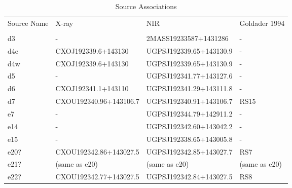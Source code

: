 \begin{table*}[htp]
\caption{Source Associations}
\begin{tabular}{llll}
\label{tab:associations}
Source Name & X-ray & NIR & Goldader 1994 \\
 &  &  &  \\
\hline
d3 & - & 2MASS19233587+1431286 & - \\
d4e & CXOJ192339.6+143130 & UGPSJ192339.65+143130.9 & - \\
d4w & CXOJ192339.6+143130 & UGPSJ192339.65+143130.9 & - \\
d5 & - & UGPSJ192341.77+143127.6 & - \\
d6 & CXOJ192341.1+143110 & UGPSJ192341.29+143111.8 & - \\
d7 & CXOU192340.96+143106.7 & UGPSJ192340.91+143106.7 & RS15 \\
e7 & - & UGPSJ192344.79+142911.2 & - \\
e14 & - & UGPSJ192342.60+143042.2 & - \\
e15 & - & UGPSJ192338.65+143005.8 & - \\
e20? & CXOU192342.86+143027.5 & UGPSJ192342.85+143027.7 & RS7 \\
e21? & (same as e20) & (same as e20) & (same as e20) \\
e22? & CXOU192342.77+143027.5 & UGPSJ192342.84+143027.5 & RS8 \\
\hline
\end{tabular}

\end{table*}
